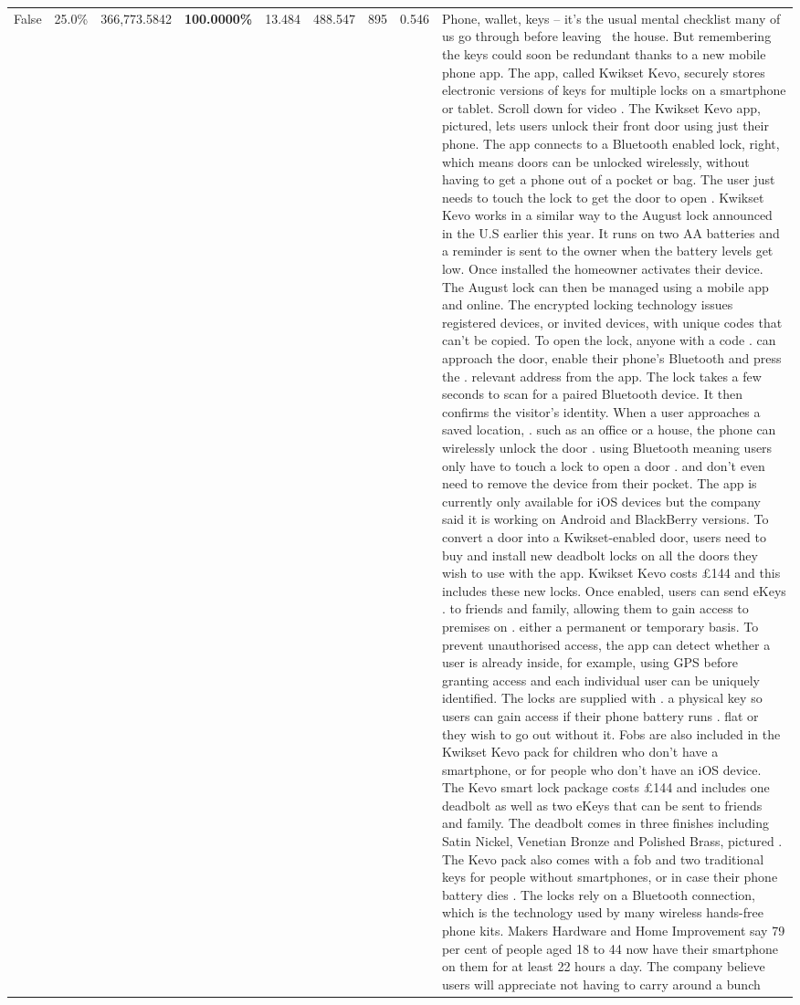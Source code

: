 \begin{table}[H]
\begin{tabular}{lllrlllll}
False & 25.0\% & 366,773.5842 & \bfseries \color{red} 100.0000\% & 13.484 & 488.547 & 895 & 0.546 & Phone, wallet, keys – it’s the usual mental checklist many of us go through before leaving  the house. But remembering the keys could soon be redundant thanks to a new mobile phone app. The app, called Kwikset Kevo, securely stores electronic versions of keys for multiple locks on a smartphone or tablet. Scroll down for video . The Kwikset Kevo app, pictured, lets users unlock their front door using just their phone. The app connects to a Bluetooth enabled lock, right, which means doors can be unlocked wirelessly, without having to get a phone out of a pocket or bag. The user just needs to touch the lock to get the door to open . Kwikset Kevo works in a similar way to the August lock announced in the U.S earlier this year. It runs on two AA batteries and a reminder is sent to the owner when the battery levels get low. Once installed the homeowner activates their device. The August lock can then be managed using a mobile app and online. The encrypted locking technology issues registered devices, or invited devices, with unique codes that can't be copied. To open the lock, anyone with a code . can approach the door, enable their phone's Bluetooth and press the . relevant address from the app. The lock takes a few seconds to scan for a paired Bluetooth device. It then confirms the visitor's identity. When a user approaches a saved location, . such as an office or a house, the phone can wirelessly unlock the door . using Bluetooth meaning users only have to touch a lock to open a door . and don't even need to remove the device from their pocket. The app is currently only available for iOS devices but the company said it is working on Android and BlackBerry versions. To convert a door into a Kwikset-enabled door, users need to buy and install new deadbolt locks on all the doors they wish to use with the app. Kwikset Kevo costs £144 and this includes these new locks. Once enabled, users can send eKeys . to friends and family, allowing them to gain access to premises on . either a permanent or temporary basis. To prevent unauthorised access, the app can detect whether a user is already inside, for example, using GPS before granting access and each individual user can be uniquely identified. The locks are supplied with . a physical key so users can gain access if their phone battery runs . flat or they wish to go out without it. Fobs are also included in the Kwikset Kevo pack for children who don't have a smartphone, or for people who don't have an iOS device. The Kevo smart lock package costs £144 and includes one deadbolt as well as two eKeys that can be sent to friends and family. The deadbolt comes in three finishes including Satin Nickel, Venetian Bronze and Polished Brass, pictured . The Kevo pack also comes with a fob and two traditional keys for people without smartphones, or in case their phone battery dies . The locks rely on a Bluetooth connection, which is the technology used by many wireless hands-free phone kits. Makers Hardware and Home Improvement say 79 per cent of people aged 18 to 44 now have their smartphone on them for at least 22 hours a day. The company believe users will appreciate not having to carry around a bunch 
\end{tabular}
\end{table}
